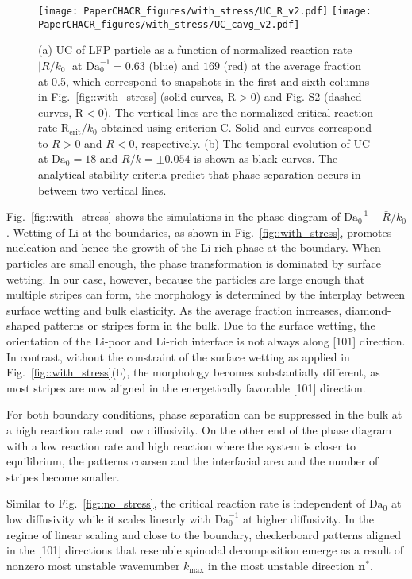 \documentclass[reprint,aps,pre,superscriptaddress]{revtex4-2}
\begin{document}
\begin{figure*}
  \texttt{[image: PaperCHACR\_figures/with\_stress/UC\_R\_v2.pdf]}
  \texttt{[image: PaperCHACR\_figures/with\_stress/UC\_cavg\_v2.pdf]}
  \caption{(a) UC of LFP particle as a function of normalized reaction rate $|R/k_0|$ at $\text{Da}_0^{-1}=0.63$ (blue) and $169$ (red) at the average fraction at 0.5, which correspond to snapshots in the first and sixth columns in Fig.~\ref{fig::with_stress} (solid curves, $\text{R}>0$) and Fig. S2 (dashed curves, $\text{R}<0$). The vertical lines are the normalized critical reaction rate $\text{R}_\text{crit}/k_0$ obtained using criterion C. Solid and curves correspond to $R>0$ and $R<0$, respectively. (b) The temporal evolution of UC at $\text{Da}_0=18$ and $R/k=\pm 0.054$ is shown as black curves. The analytical stability criteria predict that phase separation occurs in between two vertical lines. }
  \label{fig::with_stress_UC}
\end{figure*}

Fig.~\ref{fig::with_stress} shows the simulations in the phase diagram of $\text{Da}_0^{-1}-\bar{R}/k_0$.
Wetting of Li at the boundaries, as shown in Fig.~\ref{fig::with_stress}, promotes nucleation and hence the growth of the Li-rich phase at the boundary. When particles are small enough, the phase transformation is dominated by surface wetting\cite{Cogswell2018a}. In our case, however, because the particles are large enough that multiple stripes can form, the morphology is determined by the interplay between surface wetting and bulk elasticity.
As the average fraction increases, diamond-shaped patterns or stripes form in the bulk. Due to the surface wetting, the orientation of the Li-poor and Li-rich interface is not always along [101] direction. In contrast, without the constraint of the surface wetting as applied in Fig.~\ref{fig::with_stress}(b), the morphology becomes substantially different, as most stripes are now aligned in the energetically favorable [101] direction.

For both boundary conditions, phase separation can be suppressed in the bulk at a high reaction rate and low diffusivity. On the other end of the phase diagram with a low reaction rate and high reaction where the system is closer to equilibrium, the patterns coarsen and the interfacial area and the number of stripes become smaller.

Similar to Fig.~\ref{fig::no_stress}, the critical reaction rate is independent of $\text{Da}_0$ at low diffusivity while it scales linearly with $\text{Da}_0^{-1}$ at higher diffusivity. In the regime of linear scaling and close to the boundary, checkerboard patterns aligned in the [101] directions that resemble spinodal decomposition emerge as a result of nonzero most unstable wavenumber $k_\text{max}$ in the most unstable direction $\mathbf{n}^*$.
\end{document}
